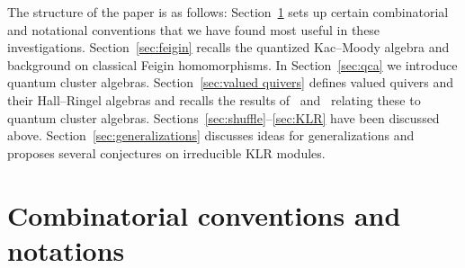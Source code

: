 \documentclass[pdftex]{sigma}
\numberwithin{equation}{section}
\begin{document}
The structure of the paper is as follows: Section~\ref{sec:combinatorics} sets up certain combinatorial and notational
conventions that we have found most useful in these investigations.
Section~\ref{sec:feigin} recalls the quantized Kac--Moody algebra and background on classical Feigin homomorphisms.
In Section~\ref{sec:qca} we introduce quantum cluster algebras.
Section~\ref{sec:valued quivers} def\/ines valued quivers and their Hall--Ringel algebras and recalls the results
of~\cite{qin,rupel1,rupel2} and~\cite{berenstein-rupel} relating these to quantum cluster algebras.
Sections~\ref{sec:shuffle}--\ref{sec:KLR} have been discussed above.
Section~\ref{sec:generalizations} discusses ideas for generalizations and proposes several conjectures on irreducible KLR modules.

\section{Combinatorial conventions and notations}\label{sec:combinatorics}
\end{document}
